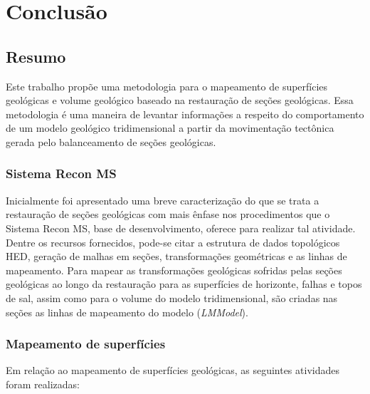 
\chapter{Conclusão}

\section{Resumo}

Este trabalho propõe uma metodologia para o mapeamento de superfícies geológicas e volume geológico baseado na restauração de seções geológicas. Essa metodologia é uma maneira de levantar informações a respeito do comportamento de um modelo geológico tridimensional a partir da movimentação tectônica gerada pelo balanceamento de seções geológicas.

\subsection*{Sistema Recon MS}

Inicialmente foi apresentado uma breve caracterização do que se trata a restauração de seções geológicas com mais ênfase nos procedimentos que o Sistema Recon MS, base de desenvolvimento, oferece para realizar tal atividade. Dentre os recursos fornecidos, pode-se citar a estrutura de dados topológicos HED, geração de malhas em seções, transformações geométricas e as linhas de mapeamento. Para mapear as transformações geológicas sofridas pelas seções geológicas ao longo da restauração para as superfícies de horizonte, falhas e topos de sal, assim como para o volume do modelo tridimensional, são criadas nas seções as linhas de mapeamento do modelo (\emph{LMModel}). 

\subsection*{Mapeamento de superfícies}

Em relação ao mapeamento de superfícies geológicas, as seguintes atividades foram realizadas:

